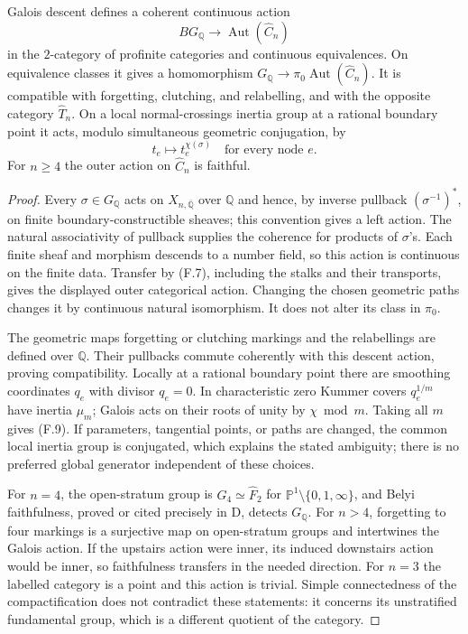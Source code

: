 Galois descent defines a coherent continuous action
\[
 BG_{\mathbb Q}\longrightarrow\operatorname{Aut}(\widehat C_n)
\]
in the $2$-category of profinite categories and continuous equivalences. On equivalence classes it gives a homomorphism
$G_{\mathbb Q}\to\pi_0\operatorname{Aut}(\widehat C_n)$.
It is compatible with forgetting, clutching, and relabelling, and with the opposite category $\widehat T_n$. On a local normal-crossings inertia group at a rational boundary point it acts, modulo simultaneous geometric conjugation, by
\[
 t_e\longmapsto t_e^{\chi(\sigma)} \quad\text{for every node }e. \tag{F.9}
\]
For $n\geq4$ the outer action on $\widehat C_n$ is faithful.
\begin{proof}
Every $\sigma\in G_{\mathbb Q}$ acts on $X_{n,\overline{\mathbb Q}}$ over $\mathbb Q$ and hence, by inverse pullback $(\sigma^{-1})^*$, on finite boundary-constructible sheaves; this convention gives a left action. The natural associativity of pullback supplies the coherence for products of $\sigma$'s. Each finite sheaf and morphism descends to a number field, so this action is continuous on the finite data. Transfer by (F.7), including the stalks and their transports, gives the displayed outer categorical action. Changing the chosen geometric paths changes it by continuous natural isomorphism. It does not alter its class in $\pi_0$.

The geometric maps forgetting or clutching markings and the relabellings are defined over $\mathbb Q$. Their pullbacks commute coherently with this descent action, proving compatibility. Locally at a rational boundary point there are smoothing coordinates $q_e$ with divisor $q_e=0$. In characteristic zero Kummer covers $q_e^{1/m}$ have inertia $\mu_m$; Galois acts on their roots of unity by $\chi\bmod m$. Taking all $m$ gives (F.9). If parameters, tangential points, or paths are changed, the common local inertia group is conjugated, which explains the stated ambiguity; there is no preferred global generator independent of these choices.

For $n=4$, the open-stratum group is $\widehat G_4\simeq\widehat F_2$ for $\mathbb P^1\setminus\{0,1,\infty\}$, and Belyi faithfulness, proved or cited precisely in D, detects $G_{\mathbb Q}$. For $n>4$, forgetting to four markings is a surjective map on open-stratum groups and intertwines the Galois action. If the upstairs action were inner, its induced downstairs action would be inner, so faithfulness transfers in the needed direction. For $n=3$ the labelled category is a point and this action is trivial. Simple connectedness of the compactification does not contradict these statements: it concerns its unstratified fundamental group, which is a different quotient of the category.
\end{proof}

